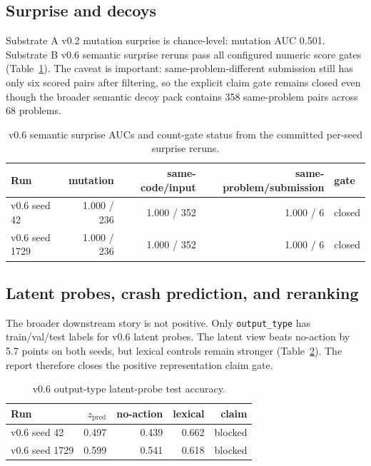 \documentclass[11pt]{article}
\newcommand{\code}[1]{\texttt{#1}}
\newcommand{\subA}{Substrate A}
\newcommand{\subB}{Substrate B}
\begin{document}
\subsection{Surprise and decoys}

\subA{} v0.2 mutation surprise is chance-level: mutation AUC 0.501. \subB{}
v0.6 semantic surprise reruns pass all configured numeric score gates
(Table~\ref{tab:surprise}). The caveat is important: same-problem-different
submission still has only six scored pairs after filtering, so the explicit
claim gate remains closed even though the broader semantic decoy pack contains
358 same-problem pairs across 68 problems.

\begin{table}[t]
\centering
\caption{v0.6 semantic surprise AUCs and count-gate status from the committed
per-seed surprise reruns.}
\label{tab:surprise}
\begin{tabular}{lrrrl}
\toprule
Run & mutation & same-code/input & same-problem/submission & gate \\
\midrule
v0.6 seed 42 & 1.000 / 236 & 1.000 / 352 & 1.000 / 6 & closed \\
v0.6 seed 1729 & 1.000 / 236 & 1.000 / 352 & 1.000 / 6 & closed \\
\bottomrule
\end{tabular}
\end{table}

\subsection{Latent probes, crash prediction, and reranking}

The broader downstream story is not positive. Only \code{output\_type} has
train/val/test labels for v0.6 latent probes. The latent view beats no-action
by 5.7 points on both seeds, but lexical controls remain stronger
(Table~\ref{tab:probe}). The report therefore closes the positive
representation claim gate.

\begin{table}[t]
\centering
\caption{v0.6 output-type latent-probe test accuracy.}
\label{tab:probe}
\begin{tabular}{lrrrr}
\toprule
Run & \(z_{\mathrm{pred}}\) & no-action & lexical & claim \\
\midrule
v0.6 seed 42 & 0.497 & 0.439 & 0.662 & blocked \\
v0.6 seed 1729 & 0.599 & 0.541 & 0.618 & blocked \\
\bottomrule
\end{tabular}
\end{table}
\end{document}
